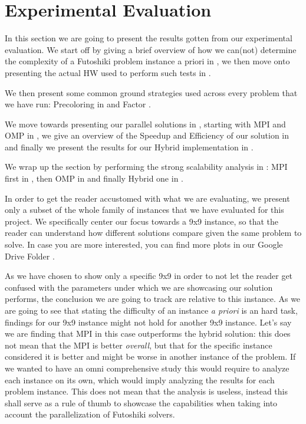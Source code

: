 \section{Experimental Evaluation}
\label{sec:evaluation}

In this section we are going to present the results gotten from our experimental evaluation. We start off by giving a brief overview of how we can(not) determine the complexity of a Futoshiki problem instance a priori in , we then move onto presenting the actual HW used to perform such tests in . 

We then present some common ground strategies used across every problem that we have run: Precoloring in  and Factor .

We move towards presenting our parallel solutions in , starting with MPI and OMP in , we give an overview of the Speedup and Efficiency of our solution in  and finally we present the results for our Hybrid implementation in .

We wrap up the section by performing the strong scalability analysis in : MPI first in , then OMP in  and finally Hybrid one in .


In order to get the reader accustomed with what we are evaluating, we present only a subset of the whole family of instances that we have evaluated for this project. We specifically center our focus towards a 9x9 instance, so that the reader can understand how different solutions compare given the same problem to solve. In case you are more interested, you can find more plots in our Google Drive Folder \cite{drive}.

As we have chosen to show only a specific 9x9 in order to not let the reader get confused with the parameters under which we are showcasing our solution performs, the conclusion we are going to track are relative to this instance. As we are going to see that stating the difficulty of an instance \textit{a priori} is an hard task, findings for our 9x9 instance might not hold for another 9x9 instance. Let's say we are finding that MPI in this case outperforms the hybrid solution: this does not mean that the MPI is better \textit{overall}, but that for the specific instance considered it is better and might be worse in another instance of the problem. If we wanted to have an omni comprehensive study this would require to analyze each instance on its own, which would imply analyzing the results for each problem instance. This does not mean that the analysis is useless, instead this shall serve as a rule of thumb to showcase the capabilities when taking into account the parallelization of Futoshiki solvers. 

